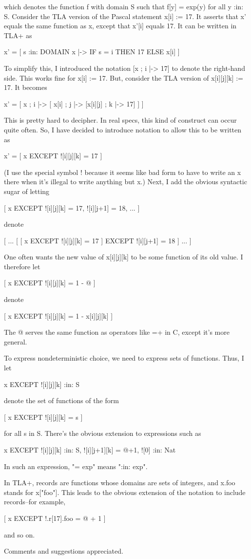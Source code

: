 \begin{spec}
    [ s :in: S |-> exp(x) ]

which denotes the function f with domain S such that f[y] = exp(y)
for all y :in: S.  Consider the TLA version of the Pascal statement
x[i] := 17.  It asserts that x' equals the same function as x,
except that x'[i] equals 17.  It can be written in TLA+ as

   x' = [ s :in: DOMAIN x |-> IF s = i THEN 17 ELSE x[i] ]

To simplify this, I introduced the notation [x ; i |-> 17] to denote
the right-hand side.  This works fine for x[i] := 17.  But, consider
the TLA version of x[i][j][k] := 17.  It becomes

  x' = [ x ; i |-> [ x[i] ; j |-> [x[i][j] ; k |-> 17] ] ]

This is pretty hard to decipher.  In real specs, this kind of
construct can occur quite often.  So, I have decided to introduce
notation to allow this to be written as

  x' = [ x EXCEPT ![i][j][k] = 17 ]

(I use the special symbol ! because it seems like bad form to have
to write an x there when it's illegal to write anything but x.)
Next, I add the obvious syntactic sugar of letting

  [ x EXCEPT ![i][j][k] = 17, ![i][j+1] = 18, ...  ]

denote

  [ ... [ [ x EXCEPT ![i][j][k] = 17 ] EXCEPT ![i][j+1] = 18 ] ... ]

One often wants the new value of x[i][j][k] to be some function of
its old value.  I therefore let

  [ x EXCEPT ![i][j][k] = 1 - @ ]

denote

  [ x EXCEPT ![i][j][k] = 1 - x[i][j][k] ]

The @ serves the same function as operators like =+ in C, except
it's more general.

To express nondeterministic choice, we need to express sets of
functions.  Thus, I let

  { x EXCEPT ![i][j][k] :in: S }

denote the set of functions of the form

  [ x EXCEPT ![i][j][k] = s ] 

for all s in S.  There's the obvious extension to expressions
such as

  { x EXCEPT ![i][j][k] :in: S, ![i][j+1][k] = @+1, ![0] :in: Nat }

In such an expression, "= exp" means ":in: {exp}".

In TLA+, records are functions whose domains are sets of integers,
and x.foo stands for x["foo"].  This leads to the obvious extension
of the notation to include records--for example,

  [ x  EXCEPT !.r[17].foo = @ + 1 ]

and so on.  

Comments and suggestions appreciated.
\end{spec}

